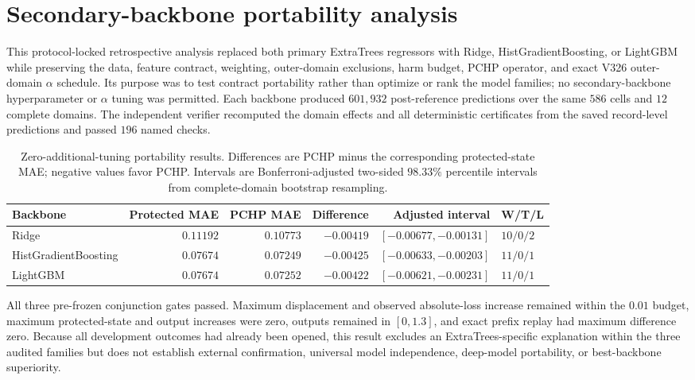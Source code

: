 \documentclass[11pt]{article}
\begin{document}
\section{Secondary-backbone portability analysis}

This protocol-locked retrospective analysis replaced both primary ExtraTrees regressors with Ridge, HistGradientBoosting, or LightGBM while preserving the data, feature contract, weighting, outer-domain exclusions, harm budget, PCHP operator, and exact V326 outer-domain $\alpha$ schedule. Its purpose was to test contract portability rather than optimize or rank the model families; no secondary-backbone hyperparameter or $\alpha$ tuning was permitted. Each backbone produced $601{,}932$ post-reference predictions over the same $586$ cells and $12$ complete domains. The independent verifier recomputed the domain effects and all deterministic certificates from the saved record-level predictions and passed $196$ named checks.

\begin{table}[H]
\centering
\caption{Zero-additional-tuning portability results. Differences are PCHP minus the corresponding protected-state MAE; negative values favor PCHP. Intervals are Bonferroni-adjusted two-sided $98.33\%$ percentile intervals from complete-domain bootstrap resampling.}
\label{tab:backbone_portability}
\scriptsize
\begin{tabularx}{\textwidth}{>{\raggedright\arraybackslash}Xrrrrl}
\toprule
Backbone & Protected MAE & PCHP MAE & Difference & Adjusted interval & W/T/L \\
\midrule
Ridge & $0.11192$ & $0.10773$ & $-0.00419$ & $[-0.00677,-0.00131]$ & $10/0/2$ \\
HistGradientBoosting & $0.07674$ & $0.07249$ & $-0.00425$ & $[-0.00633,-0.00203]$ & $11/0/1$ \\
LightGBM & $0.07674$ & $0.07252$ & $-0.00422$ & $[-0.00621,-0.00231]$ & $11/0/1$ \\
\bottomrule
\end{tabularx}
\end{table}

All three pre-frozen conjunction gates passed. Maximum displacement and observed absolute-loss increase remained within the $0.01$ budget, maximum protected-state and output increases were zero, outputs remained in $[0,1.3]$, and exact prefix replay had maximum difference zero. Because all development outcomes had already been opened, this result excludes an ExtraTrees-specific explanation within the three audited families but does not establish external confirmation, universal model independence, deep-model portability, or best-backbone superiority.
\end{document}

